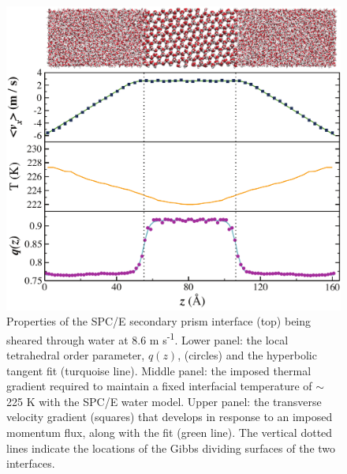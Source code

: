 \begin{figure}
\includegraphics[width=\linewidth]{Figures/SecPrismComicStrip}
\caption{\label{fig:spComic} Properties of the SPC/E secondary prism
  interface (top) being sheared through water at 8.6 m
  s\textsuperscript{-1}. Lower panel: the local tetrahedral order
  parameter, $q(z)$, (circles) and the hyperbolic tangent fit
  (turquoise line).  Middle panel: the imposed thermal gradient
  required to maintain a fixed interfacial temperature of $\sim$225 K
  with the SPC/E water model. Upper panel: the transverse velocity
  gradient (squares) that develops in response to an imposed momentum
  flux, along with the fit (green line). The vertical dotted lines
  indicate the locations of the Gibbs dividing surfaces of the two
  interfaces.}
\end{figure}


